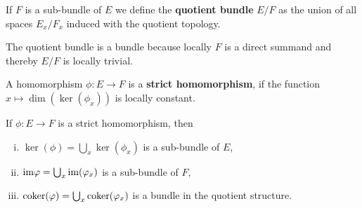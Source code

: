 \begin{definition}\label{def: Quotient bundle}
	If $F$ is a sub-bundle of $E$ we define the \textbf{quotient bundle} $E\slash F$ as the union of all spaces $E_x\slash F_x$ induced with the quotient topology. 
\end{definition}
\begin{cor}
	The quotient bundle is a bundle because locally $F$ is a direct summand and thereby $E\slash F$ is locally trivial. 
\end{cor}
\begin{definition}\label{def: Strict homomorphisms}
	A homomorphism $\phi:E\to F$ is a \textbf{strict homomorphism}, if the function $x\mapsto \dim(\ker(\phi_x))$ is locally constant.
\end{definition}
\begin{prop}
	If $\phi:E\to F$ is a strict homomorphism, then 
	\begin{enumerate}[(i)]
		\item $\ker(\phi)=\bigcup_x \ker(\phi_x)$ is a sub-bundle of $E$, \label{enum: ker}
		\item $\mathrm{im}{\varphi}=\bigcup_x \mathrm{im}(\varphi_x)$ is a sub-bundle of $F$, \label{enum: im}
		\item$\operatorname{\mathrm{coker}}(\varphi)=\bigcup_x \operatorname{\mathrm{coker}}(\varphi_x)$ is a bundle in the quotient structure. \label{enum: coker}
	\end{enumerate}
\end{prop}
